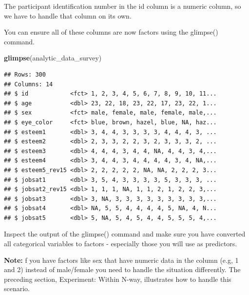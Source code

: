 \documentclass[
]{krantz}
\makeatletter
\newenvironment{Shaded}{\begin{snugshade}}{\end{snugshade}}
\newcommand{\DataTypeTok}[1]{\textcolor[rgb]{0.27,0.27,0.27}{#1}}
\newcommand{\KeywordTok}[1]{\textcolor[rgb]{0.27,0.27,0.27}{\textbf{#1}}}
\newcommand{\NormalTok}[1]{#1}
\newcommand{\OperatorTok}[1]{\textcolor[rgb]{0.43,0.43,0.43}{\textbf{#1}}}
\newcommand{\StringTok}[1]{\textcolor[rgb]{0.5,0.5,0.5}{#1}}
\newenvironment{kframe}{%
\medskip{}
\setlength{\fboxsep}{.8em}
 \def\at@end@of@kframe{}%
 \ifinner\ifhmode%
  \def\at@end@of@kframe{\end{minipage}}%
  \begin{minipage}{\columnwidth}%
 \fi\fi%
 \def\FrameCommand##1{\hskip\@totalleftmargin \hskip-\fboxsep
 \colorbox{shadecolor}{##1}\hskip-\fboxsep
     \hskip-\linewidth \hskip-\@totalleftmargin \hskip\columnwidth}%
 \MakeFramed {\advance\hsize-\width
   \@totalleftmargin\z@ \linewidth\hsize
   \@setminipage}}%
 {\par\unskip\endMakeFramed%
 \at@end@of@kframe}
\renewenvironment{Shaded}{\begin{kframe}}{\end{kframe}}
\makeatother
\begin{document}
The participant identification number in the id column is a numeric column, so we have to handle that column on its own.

\begin{Shaded}
\end{Shaded}

You can ensure all of these columns are now factors using the glimpse() command.

\begin{Shaded}
\begin{Highlighting}[]
\KeywordTok{glimpse}\NormalTok{(analytic_data_survey)}
\end{Highlighting}
\end{Shaded}

\begin{verbatim}
## Rows: 300
## Columns: 14
## $ id            <fct> 1, 2, 3, 4, 5, 6, 7, 8, 9, 10, 11...
## $ age           <dbl> 23, 22, 18, 23, 22, 17, 23, 22, 1...
## $ sex           <fct> male, female, male, female, male,...
## $ eye_color     <fct> blue, brown, hazel, blue, NA, haz...
## $ esteem1       <dbl> 3, 4, 4, 3, 3, 3, 3, 4, 4, 4, 3, ...
## $ esteem2       <dbl> 2, 3, 3, 2, 2, 3, 2, 3, 3, 3, 2, ...
## $ esteem3       <dbl> 4, 4, 4, 3, 4, 4, NA, 4, 4, 3, 4,...
## $ esteem4       <dbl> 3, 4, 4, 3, 4, 4, 4, 4, 3, 4, NA,...
## $ esteem5_rev15 <dbl> 2, 2, 2, 2, 2, NA, NA, 2, 2, 2, 3...
## $ jobsat1       <dbl> 3, 5, 4, 3, 3, 3, 3, 5, 3, 3, 3, ...
## $ jobsat2_rev15 <dbl> 1, 1, 1, NA, 1, 1, 2, 1, 2, 2, 3,...
## $ jobsat3       <dbl> 3, NA, 3, 3, 3, 3, 3, 3, 3, 3, 3,...
## $ jobsat4       <dbl> NA, 5, 5, 4, 4, 4, 4, 5, NA, 4, N...
## $ jobsat5       <dbl> 5, NA, 5, 4, 5, 4, 4, 5, 5, 5, 4,...
\end{verbatim}

Inspect the output of the glimpse() command and make sure you have converted all categorical variables to factors - especially those you will use as predictors.

\textbf{Note:} f you have factors like sex that have numeric data in the column (e.g, 1 and 2) instead of male/female you need to handle the situation differently. The preceding section, Experiment: Within N-way, illustrates how to handle this scenario.
\end{document}

